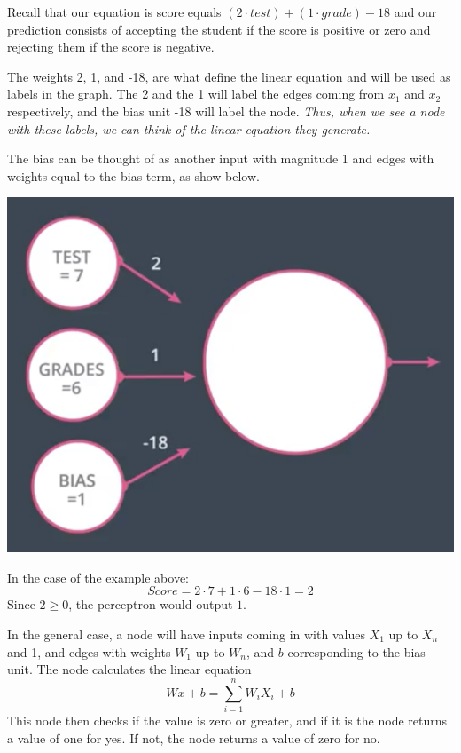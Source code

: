 Recall that our equation is score equals \( (2 \cdot test) + (1 \cdot grade) - 18\) and our prediction consists of accepting the student if the score is positive or zero and rejecting them if the score is negative. \newline

The weights 2, 1, and -18, are what define the linear equation and will be used as labels in the graph. The 2 and the 1 will label the edges coming from \(x_1\) and \(x_2\) respectively, and the bias unit -18 will label the node.
\textit{Thus, when we see a node with these labels, we can think of the linear equation they generate.} \newline

The bias can be thought of as another input with magnitude 1 and edges with weights equal to the bias term, as show below.

\includegraphics[width=1\linewidth]{img//intro/perceptron-5.png}

In the case of the example above:
\[Score = 2 \cdot 7 + 1 \cdot 6 - 18 \cdot 1 = 2\]
Since \(2 \geq 0\), the perceptron would output \(1\). \newline

In the general case, a node will have inputs coming in with values \(X_1\) up to \(X_n\) and 1, and edges with weights \(W_1\) up to \(W_n\), and \(b\) corresponding to the bias unit. The node calculates the linear equation
\[Wx + b = \sum^n_{i = 1} W_i X_i + b\]
This node then checks if the value is zero or greater, and if it is the node returns a value of one for yes. If not, the node returns a value of zero for no. \newline

